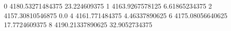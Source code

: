 0 4180.53271484375 23.224609375
1 4163.9267578125 6.61865234375
2 4157.30810546875 0.0
4 4161.771484375 4.46337890625
6 4175.08056640625 17.7724609375
8 4190.21337890625 32.9052734375
